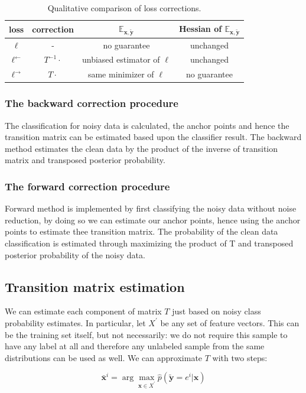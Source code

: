 \documentclass{article} %
\begin{document}
\begin{table}
\begin{tabular}{cccc}
loss & correction & $\mathbb{E}_{\boldsymbol{x},\tilde{\boldsymbol{y}}}$ & Hessian of $\mathbb{E}_{\boldsymbol{x},\tilde{\boldsymbol{y}}}$ \\\hline
$\ell$ & - & no guarantee & unchanged \\
$\ell^\leftarrow$ & $T^{-1}\cdot$ & unbiased estimator of $\ell$ & unchanged \\
$\ell^\rightarrow$ & $T\cdot$ & same minimizer of $\ell$ & no guarantee
\end{tabular}
\caption{Qualitative comparison of loss corrections. \label{tab:loss}}
\end{table}

\subsubsection{The backward correction procedure}
The classification for noisy data is calculated, the anchor points and hence the transition matrix can be estimated based upon the classifier result. The backward method estimates the clean data by the product of the inverse of transition matrix and transposed posterior probability.

\subsubsection{The forward correction procedure}
Forward method is implemented by first classifying the noisy data without noise reduction, by doing so we can estimate our anchor points, hence using the anchor points to estimate thee transition matrix. The probability of the clean data classification is estimated through maximizing the product of T and transposed posterior probability of the noisy data.

\subsection{Transition matrix estimation}
We can estimate each component of matrix $T$ just based on noisy class probability estimates. In particular, let $X^\prime$ be any set of feature vectors. This can be the training set itself, but not necessarily: we do not require this sample to have any label at all and therefore any unlabeled sample from the same distributions can be used as well. We can approximate $T$ with two steps: \cite{labelnoise}

\begin{equation}
\bar{\boldsymbol{x}}^i = \arg\max_{\boldsymbol{x}\in X^\prime} \hat{p}\left(\tilde{\boldsymbol{y}}=e^i|\boldsymbol{x}\right)
\label{eq:x}
\end{equation}
\end{document}
